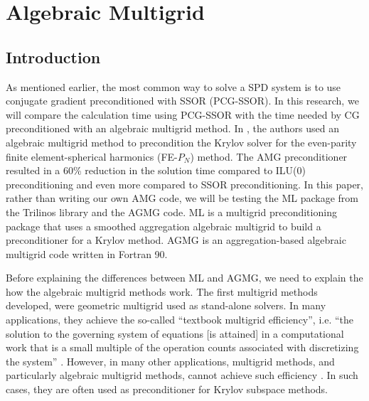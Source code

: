 \section{Algebraic Multigrid} \label{sec_amg}
\subsection{Introduction}
As mentioned earlier, the most common way to solve a SPD system is to use
conjugate gradient preconditioned with SSOR (PCG-SSOR). In this research, we
will compare the calculation time using PCG-SSOR with the time needed by CG 
preconditioned with an algebraic multigrid method. In \cite{amg_pn}, the authors 
used an algebraic multigrid method to precondition the Krylov solver for the 
even-parity finite element-spherical harmonics (FE-$P_N$) method. The AMG 
preconditioner resulted in a 60\% reduction in the solution time compared to 
ILU(0) preconditioning and even more compared to SSOR preconditioning. In this
paper, rather than writing our own AMG code, we will be testing the ML package 
\cite{ml_guide} from the Trilinos library and the AGMG code\cite{agmg_guide}. 
ML is a multigrid preconditioning package that uses a smoothed aggregation 
algebraic multigrid to build a preconditioner for a Krylov method. AGMG is an 
aggregation-based algebraic multigrid code written in Fortran 90.

Before explaining the differences between ML and AGMG, we need to explain the
how the algebraic multigrid methods work. The first multigrid methods
developed, were geometric multigrid used as stand-alone solvers. In many 
applications, they achieve the so-called ``textbook multigrid
efficiency'', i.e. ``the solution to the governing system of equations [is
attained] in a computational work that is a small multiple of the operation
counts associated with discretizing the system'' \cite{textbook_eff}. However, 
in many other applications, multigrid methods, and particularly algebraic 
multigrid methods, cannot achieve such efficiency \cite{k_cycle}. In
such cases, they are often used as preconditioner for Krylov subspace methods. 

